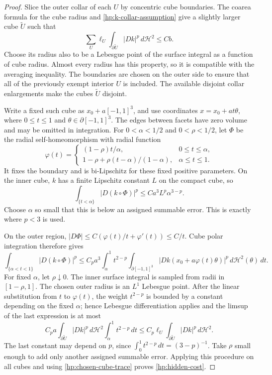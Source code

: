 \documentclass[11pt]{article}
\numberwithin{equation}{section}
\theoremstyle{definition}
\theoremstyle{remark}
\newcommand{\cH}{\mathcal H}
\begin{document}
\begin{proof}
Slice the outer collar of each $U$ by concentric cube boundaries.
The coarea formula for the cube radius and
\eqref{hp:k-collar-assumption} give a slightly larger cube
$\widetilde U$ such that
\begin{equation}\label{hp:chosen-cube-trace}
 \sum_U\ell_U\int_{\partial\widetilde U}|Dk|^p\,d\cH^2
                   \leq Cb.
\end{equation}
Choose its radius also to be a Lebesgue point of the surface integral
as a function of cube radius.  Almost every radius has this property,
so it is compatible with the averaging inequality.  The boundaries
are chosen on the outer side to ensure that all of the previously
exempt interior $U$ is included.  The available disjoint collar
enlargements make the cubes $\widetilde U$ disjoint.

Write a fixed such cube as $x_0+a[-1,1]^3$, and use coordinates
$x=x_0+at\theta$, where $0\leq t\leq1$ and
$\theta\in\partial[-1,1]^3$.  The edges between facets have zero
volume and may be omitted in integration.  For $0<\alpha<1/2$
and $0<\rho<1/2$, let $\Phi$ be the radial self-homeomorphism
with radial function
\[
 \varphi(t)=
 \begin{cases}
 (1-\rho)t/\alpha,&0\leq t\leq\alpha,\\[2pt]
 1-\rho+\rho(t-\alpha)/(1-\alpha),&\alpha\leq t\leq1.
 \end{cases}
\]
It fixes the boundary and is bi-Lipschitz for these fixed positive
parameters.  On the inner cube, $k$ has a finite Lipschitz constant
$L$ on the compact cube, so
\[
 \int_{\{t<\alpha\}}|D(k\circ\Phi)|^p
                  \leq C a^3 L^p\alpha^{3-p}.
\]
Choose $\alpha$ so small that this is below an assigned summable
error.  This is exactly where $p<3$ is used.

On the outer region,
$|D\Phi|\leq C(\varphi(t)/t+\varphi'(t))\leq C/t$.
Cube polar integration therefore gives
\[
 \int_{\{\alpha<t<1\}}|D(k\circ\Phi)|^p
 \leq C_pa^3\int_\alpha^1t^{2-p}
       \int_{\partial[-1,1]^3}
          |Dk(x_0+a\varphi(t)\theta)|^p\,d\cH^2(\theta)\,dt.
\]
For fixed $\alpha$, let $\rho\downarrow0$.  The inner surface
integral is sampled from radii in $[1-\rho,1]$.  The chosen outer
radius is an $L^1$ Lebesgue point.  After the linear substitution
from $t$ to $\varphi(t)$, the weight $t^{2-p}$ is bounded by a
constant depending on the fixed $\alpha$; hence Lebesgue
differentiation applies and the limsup of the last expression is
at most
\[
 C_pa\int_{\partial\widetilde U}|Dk|^p\,d\cH^2
                   \int_\alpha^1t^{2-p}\,dt
 \leq C_p\ell_U\int_{\partial\widetilde U}|Dk|^p\,d\cH^2.
\]
The last constant may depend on $p$, since
$\int_0^1t^{2-p}\,dt=(3-p)^{-1}$.  Take $\rho$ small enough to
add only another assigned summable error.  Applying this procedure
on all cubes and using \eqref{hp:chosen-cube-trace} proves
\eqref{hp:hidden-cost}.


\end{proof}
\end{document}
